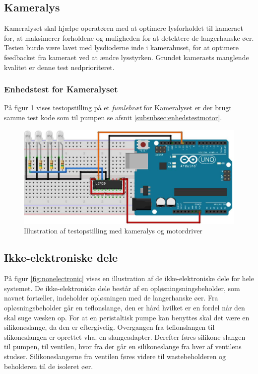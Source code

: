 \newpage
 \subsection{Kameralys}
 \label{subsec:kameralys}
Kameralyset skal hjælpe operatøren med at optimere lysforholdet til kameraet for, at maksimerer forholdene og muligheden for at detektere de langerhanske øer. Testen burde være lavet med lysdioderne inde i kamerahuset, for at optimere feedbacket fra kameraet ved at ændre lysstyrken. Grundet kameraets manglende kvalitet er denne test nedprioriteret.

\subsubsection{Enhedstest for Kameralyset}
På figur \ref{fig:LEDbreadboard} vises testopstilling på et \textit{fumlebræt} for Kameralyset er der brugt samme test kode som til pumpen se afsnit \ref{subsubsec:enhedstestmotor}. 

\begin{figure}[H]
	\centering
	\includegraphics[width=1\textwidth]{billeder/Hardware/diagrammer/LEDbreadboard.JPG}
	\caption{Illustration af testopstilling med kameralys og motordriver}
	\label{fig:LEDbreadboard}
\end{figure}

 
\newpage 
\subsection{Ikke-elektroniske dele}
På figur \ref{fig:nonelectronic} vises en illustration af de ikke-elektroniske dele for hele systemet. De ikke-elektroniske dele består af en opløsningsningsbeholder, som navnet fortæller, indeholder opløsningen med de langerhanske øer. Fra opløsningsbeholder går en teflonslange, den er hård hvilket er en fordel når den skal suge væsken op. For at en peristaltisk pumpe kan benyttes skal det være en silikoneslange, da den er eftergivelig. Overgangen fra teflonslangen til slikoneslangen er oprettet vha. en slangeadapter. Derefter føres silikone slangen til pumpen, til ventilen, hvor fra der går en silikoneslange fra hver af ventilens studser. Silikoneslangerne fra ventilen føres videre til wastebeholderen og beholderen til de isoleret øer.

